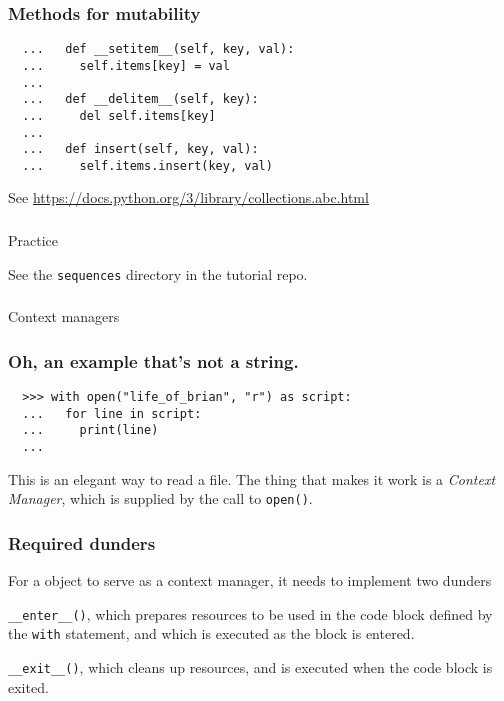 \documentclass[aspectratio=169]{beamer}
\begin{document}
\begin{frame}[fragile]
  \frametitle{Methods for mutability}
  
  \begin{verbatim}
  ...   def __setitem__(self, key, val):
  ...     self.items[key] = val
  ...
  ...   def __delitem__(self, key):
  ...     del self.items[key]
  ...
  ...   def insert(self, key, val):
  ...     self.items.insert(key, val) 

  \end{verbatim}
  
  \bigbreak
  See \url{https://docs.python.org/3/library/collections.abc.html}
 \end{frame}


\begin{frame}
  \frametitle{} 
   
   \centerline{\huge Practice} 
   \centerline{See the \texttt{sequences} directory in the tutorial repo.} 
   
   \end{frame}
\begin{frame}
  \frametitle{} 
  \centerline{\huge Context managers}
 \end{frame}

\begin{frame}[fragile]
  \frametitle{Oh, an example that's not a string.}
  
  \begin{verbatim}
  >>> with open("life_of_brian", "r") as script:
  ...   for line in script:
  ...     print(line)
  ...  
  \end{verbatim}
  
  \bigbreak 
  This is an elegant way to read a file. The thing that makes it work is a \emph{Context Manager},
  which is supplied by the call to \texttt{open()}.
  
  \end{frame}
\begin{frame}[fragile]
  \frametitle{Required dunders}
  
  For a object to serve as a context manager, it needs to implement two dunders
  
  \bigbreak
  \texttt{\_\_enter\_\_()}, which prepares resources to be used in the code block defined by the \texttt{with} statement,
  and which is executed as the block is entered.
  
  \bigbreak
  \texttt{\_\_exit\_\_()}, which cleans up resources, and is executed when the code block is exited.

  \end{frame}
 
\end{document}
